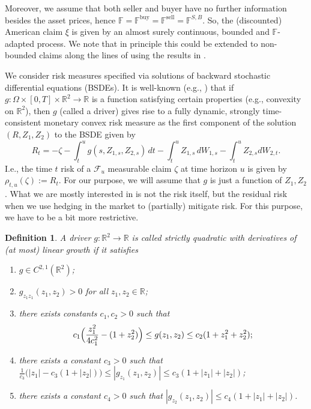 \documentclass{article}
\newtheorem{definition}{Definition}[section]
\begin{document}
Moreover, we assume that both seller and buyer have no further information besides the asset prices, hence $\mathbb{F} = \mathbb{F}^{\text{buy}} = \mathbb{F}^{\text{sell}} = \mathbb{F}^{S,B}$. So, the (discounted) American claim $\xi$ is given by an almost surely continuous, bounded and $\mathbb{F}$-adapted process. We note that in principle this could be extended to non-bounded claims along the lines of \cite{HLT24} using the results in \cite{Sun21}.

We consider risk measures specified via solutions of backward stochastic differential equations (BSDEs). It is well-known (e.g., \cite{BEK09}) that if $g: \Omega \times [0,T] \times \mathbb{R}^{2} \to \mathbb{R}$ is a function satisfying certain properties (e.g., convexity on $\mathbb{R}^{2}$), then $g$ (called a driver) gives rise to a fully dynamic, strongly time-consistent monetary convex risk measure as the first component of the solution $(R,Z_{1}, Z_{2})$ to the BSDE given by
\begin{equation*}
	R_{t} = -\zeta - \int_t^u g(s, Z_{1,s},Z_{2,s})\,dt - \int_t^u Z_{1,s}\,dW_{1,s} -\int_t^u Z_{2,s}dW_{2,t}.
\end{equation*}
I.e., the time $t$ risk of a $\mathcal{F}_u$ measurable claim $\zeta$ at time horizon $u$ is given by $\rho_{t,u}(\zeta):= R_{t}$. For our purpose, we will assume that $g$ is just a function of $Z_{1}, Z_{2}$. What we are mostly interested in is not the risk itself, but the residual risk when we use hedging in the market to (partially) mitigate risk. For this purpose, we have to be a bit more restrictive.

\begin{definition} \label{def:driver}
	A driver $g : \mathbb{R}^{2} \to \mathbb{R}$ is called strictly quadratic with derivatives of (at most) linear growth if it satisfies
	\begin{enumerate}
		\item $g \in C^{2,1}(\mathbb{R}^{2})$;
		\item $g_{z_{1}z_{1}}(z_{1},z_{2}) > 0$ for all $z_{1},z_{2} \in \mathbb{R}$;
		\item there exists constants $c_{1}, c_{2} > 0$ such that
			\begin{equation*}
			c_{1}\Bigl(\frac{z_{1}^{2}}{4c_{1}^{2}} - (1 + z_{2}^{2}) \Bigr) \leq g(z_{1},z_{2}) \leq c_{2}(1 + z_{1}^{2} + z_{2}^{2});
			\end{equation*}
		\item there exists a constant $c_3>0$ such that $\frac{1}{c_{3}} \bigl( |z_{1}| - c_{3}(1 + |z_{2}|) \bigr) \leq |g_{z_{1}}(z_{1},z_{2})| \leq c_{3}(1 + |z_{1}| + |z_{2}|)$; 
		\item there exists a constant $c_4>0$ such that $|g_{z_{2}}(z_{1},z_{2})| \leq c_{4}(1 + |z_{1}| + |z_{2}|)$.
	\end{enumerate}
\end{definition}
\end{document}
